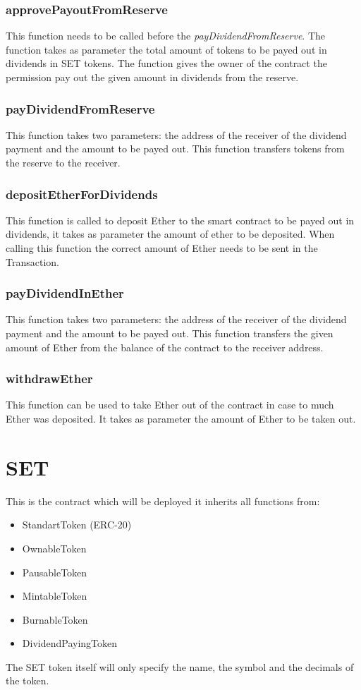 \documentclass[12pt,a4paper]{article}
\begin{document}
\subsubsection*{approvePayoutFromReserve}
This function needs to be called before the \textit{payDividendFromReserve}. The function takes as parameter the total amount of tokens to be payed out in dividends in SET tokens. The function gives the owner of the contract the permission pay out the given amount in dividends from the reserve. 
\subsubsection*{payDividendFromReserve}
This function takes two parameters: the address of the receiver of the dividend payment and the amount to be payed out. This function transfers tokens from the reserve to the receiver.
\subsubsection*{depositEtherForDividends}
This function is called to deposit Ether to the smart contract to be payed out in dividends, it takes as parameter the amount of ether to be deposited. When calling this function the correct amount of Ether needs to be sent in the Transaction.
\subsubsection*{payDividendInEther}
This function takes two parameters: the address of the receiver of the dividend payment and the amount to be payed out. This function transfers the given amount of Ether from the balance of the contract to the receiver address.
\subsubsection*{withdrawEther}
This function can be used to take Ether out of the contract in case to much Ether was deposited. It takes as parameter the amount of Ether to be taken out.
\section*{SET}
This is the contract which will be deployed it inherits all functions from: \begin{itemize}
\item StandartToken (ERC-20)
\item OwnableToken
\item PausableToken
\item MintableToken
\item BurnableToken
\item DividendPayingToken
\end{itemize}
The SET token itself will only specify the name, the symbol and the decimals of the token.
\end{document}
